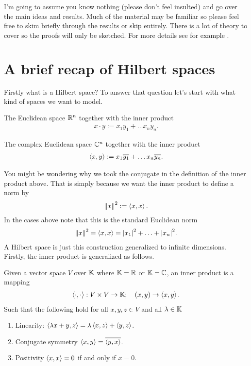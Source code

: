 \documentclass[
    a4paper,
    DIV=14,
    abstract=true,
    numbers=noenddot
]{scrartcl}
\begin{document}
	I'm going to assume you know nothing (please don't feel insulted) and go over the main ideas and results.	Much of the material may be familiar so please feel free to skim briefly through the results or skip entirely. There is a lot of theory to cover so the proofs will only be sketched.
	For more details see for example \cite{Bachman2000functional}.     \section{A brief recap of Hilbert spaces}
	Firstly what is a Hilbert space? To answer that question let's start with what kind of spaces we want to model.
	\begin{example}
		The Euclidean space $\mathbb{R}^n$ together with the inner product
		\begin{align*}
			x \cdot y:= x_1 y_1+\ldots x_n y_n.
		\end{align*}
	\end{example}
	\begin{example}
		The complex Euclidean space $\mathbb{C}^n$ together with the inner product
		\begin{align*}
			\left\langle x,y\right\rangle:= x_1 \overline{y_1}+\ldots x_n \overline{y_n}.
		\end{align*}
	\end{example}
	You might be wondering why we took the conjugate in the definition of the inner product above. That is simply because we want the inner product to define a norm by
	\begin{align*}
		\left\lVert x \right\rVert^2:= \left\langle x,x\right\rangle.
	\end{align*}
	In the cases above note that this is the standard Euclidean norm
	\begin{align*}
		\left\lVert x \right\rVert^2= \left\langle x,x\right\rangle= {\left| x_1 \right|} ^2+\ldots +{\left| x_n \right|}^2 .
	\end{align*}
	A Hilbert space is just this construction generalized to infinite dimensions. Firstly, the inner product is generalized as follows.
	\begin{definition}
		Given a vector space $V$ over  $\mathbb{K}$ where $\mathbb{K} =\mathbb{R}$ or $\mathbb{K}=\mathbb{C}$, an inner product is a mapping
		\begin{align*}
			\left\langle\cdot ,\cdot \right\rangle: V \times V \to \mathbb{K}; \quad (x,y)\to \left\langle x,y\right\rangle.
		\end{align*}
		Such that the following hold for all $x,y,z \in V$ and all $\lambda \in \mathbb{K}$
		\begin{enumerate}
			\item Linearity: $\left\langle\lambda x+y,z\right\rangle= \lambda \left\langle x,z\right\rangle+ \left\langle y,z\right\rangle$.
			\item Conjugate symmetry $\left\langle x,y\right\rangle= \overline{\left\langle y,x\right\rangle}$.
			\item Positivity $\left\langle x,x\right\rangle =0$ if and only if $x=0$.
		\end{enumerate}
	\end{definition}
\end{document}
